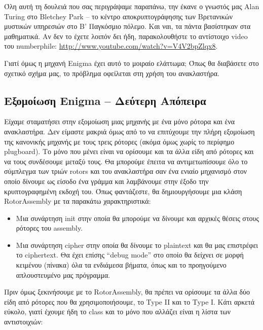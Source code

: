 \documentclass[a4paper,twoside,12pt]{article}
\begin{document}
Όλη αυτή τη δουλειά που σας περιγράψαμε παραπάνω, την έκανε ο γνωστός μας Alan Turing στο Bletchey Park – το κέντρο αποκρυπτογράφησης των Βρετανικών μυστικών υπηρεσιών στο Β' Παγκόσμιο πόλεμο. Και ναι, τα πάντα βασίστηκαν στα μαθηματικά. Αν δεν το έχετε λοιπόν δει ήδη, παρακολουθήστε το αντίστοιχο video του numberphile: \url{http://www.youtube.com/watch?v=V4V2bpZlqx8}.

Γιατί όμως η μηχανή Enigma έχει αυτό το μοιραίο ελάττωμα; Όπως θα διαβάσετε στο σχετικό σχήμα μας, το πρόβλημα οφείλεται στη χρήση του ανακλαστήρα.

\subsection{Εξομοίωση Enigma – Δεύτερη Απόπειρα}

Είχαμε σταματήσει στην εξομοίωση μιας μηχανής με ένα μόνο ρότορα και ένα ανακλαστήρα. Δεν είμαστε μακριά όμως από το να επιτύχουμε την πλήρη εξομοίωση της κανονικής μηχανής με τους τρεις ρότορες (ακόμα όμως χωρίς το περίφημο plugboard). Το μόνο που μένει είναι να ορίσουμε και τα άλλα είδη από ρότορες και να τους συνδέσουμε μεταξύ τους. Θα μπορούμε έπειτα να αντιμετωπίσουμε όλο το σύμπλεγμα των τριών rotors και του ανακλαστήρα σαν ένα ενιαίο μηχανισμό στον οποίο δίνουμε ως είσοδο ένα γράμμα και λαμβάνουμε στην έξοδο την κρυπτογραφημένη εκδοχή του. Όπως φαντάζεστε, θα δημιουργήσουμε μια κλάση RotorAssembly με τα παρακάτω χαρακτηριστικά:

\begin{itemize}
\item Μια συνάρτηση init στην οποία θα μπορούμε να δίνουμε και αρχικές θέσεις στους ρότορες του assembly.

\item Μια συνάρτηση cipher στην οποία θα δίνουμε το plaintext και θα μας επιστρέφει το ciphertext. Θα έχει επίσης “debug mode” στο οποίο θα δείχνει σε μορφή κειμένου (πίνακα) όλα τα ενδιάμεσα βήματα, όπως και το προηγούμενο απλουστευμένο μας πρόγραμμα.
\end{itemize}

Πριν όμως ξεκινήσουμε με το RotorAssembly, θα πρέπει να ορίσουμε τα άλλα δύο είδη από ρότορες που θα χρησιμοποιήσουμε, το Type II και το Type I. Κάτι αρκετά εύκολο, γιατί έχουμε ήδη το class και το μόνο που αλλάζει είναι η λίστα των αντιστοιχιών:
\end{document}
